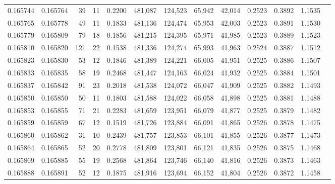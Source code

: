 \begin{tabular}{rrrrrrrrrrrrr}
0.165744 & 0.165764 &    39 &  11 &                                     0.2200 & 481,087 & 124,523 &  65,942 &  42,014 & 0.2523 & 0.3892 & 1.1535 \\
0.165765 & 0.165778 &    49 &  11 &                                     0.1833 & 481,136 & 124,474 &  65,953 &  42,003 & 0.2523 & 0.3891 & 1.1530 \\
0.165779 & 0.165809 &    79 &  18 &                                     0.1856 & 481,215 & 124,395 &  65,971 &  41,985 & 0.2523 & 0.3889 & 1.1523 \\
0.165810 & 0.165820 &   121 &  22 &                                     0.1538 & 481,336 & 124,274 &  65,993 &  41,963 & 0.2524 & 0.3887 & 1.1512 \\
0.165823 & 0.165830 &    53 &  12 &                                     0.1846 & 481,389 & 124,221 &  66,005 &  41,951 & 0.2525 & 0.3886 & 1.1507 \\
0.165833 & 0.165835 &    58 &  19 &                                     0.2468 & 481,447 & 124,163 &  66,024 &  41,932 & 0.2525 & 0.3884 & 1.1501 \\
0.165837 & 0.165842 &    91 &  23 &                                     0.2018 & 481,538 & 124,072 &  66,047 &  41,909 & 0.2525 & 0.3882 & 1.1493 \\
0.165850 & 0.165850 &    50 &  11 &                                     0.1803 & 481,588 & 124,022 &  66,058 &  41,898 & 0.2525 & 0.3881 & 1.1488 \\
0.165853 & 0.165855 &    71 &  21 &                                     0.2283 & 481,659 & 123,951 &  66,079 &  41,877 & 0.2525 & 0.3879 & 1.1482 \\
0.165859 & 0.165859 &    67 &  12 &                                     0.1519 & 481,726 & 123,884 &  66,091 &  41,865 & 0.2526 & 0.3878 & 1.1475 \\
0.165860 & 0.165862 &    31 &  10 &                                     0.2439 & 481,757 & 123,853 &  66,101 &  41,855 & 0.2526 & 0.3877 & 1.1473 \\
0.165864 & 0.165865 &    52 &  20 &                                     0.2778 & 481,809 & 123,801 &  66,121 &  41,835 & 0.2526 & 0.3875 & 1.1468 \\
0.165869 & 0.165885 &    55 &  19 &                                     0.2568 & 481,864 & 123,746 &  66,140 &  41,816 & 0.2526 & 0.3873 & 1.1463 \\
0.165888 & 0.165891 &    52 &  12 &                                     0.1875 & 481,916 & 123,694 &  66,152 &  41,804 & 0.2526 & 0.3872 & 1.1458 \\

\end{tabular}
